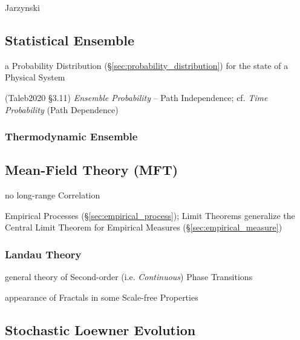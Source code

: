 Jarzynski



\subsection{Statistical Ensemble}\label{sec:statistical_ensemble}

a Probability Distribution (\S\ref{sec:probability_distribution}) for the state
of a Physical System

(Taleb2020 \S 3.11) \emph{Ensemble Probability} -- Path Independence; cf.
\emph{Time Probability} (Path Dependence)



\subsubsection{Thermodynamic Ensemble}\label{sec:thermodynamic_ensemble}



\subsection{Mean-Field Theory (MFT)}\label{sec:mft}

no long-range Correlation

\fist Empirical Processes (\S\ref{sec:empirical_process}); Limit Theorems
generalize the Central Limit Theorem for Empirical Measures
(\S\ref{sec:empirical_measure})



\subsubsection{Landau Theory}\label{sec:landau_theory}

general theory of Second-order (i.e. \emph{Continuous}) Phase Transitions

appearance of Fractals in some Scale-free Properties



\subsection{Stochastic Loewner Evolution}\label{sec:stochastic_loewner}

